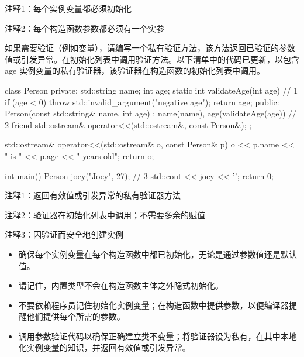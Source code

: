 {\footnotesize
注释1：每个实例变量都必须初始化

注释2：每个构造函数参数都必须有一个实参
}

如果需要验证（例如变量），请编写一个私有验证方法，该方法返回已验证的参数值或引发异常。在初始化列表中调用验证方法。以下清单中的代码已更新，以包含 age 实例变量的私有验证器，该验证器在构造函数的初始化列表中调用。


\begin{cpp}
class Person {
private:
  std::string name;
  int age;
  static int validateAge(int age) { // 1
    if (age < 0)
      throw std::invalid_argument("negative age");
    return age;
  }
public:
  Person(const std::string& name, int age) :
  name(name), age(validateAge(age)) {} // 2
  friend std::ostream& operator<<(std::ostream&, const Person&);
};

std::ostream& operator<<(std::ostream& o, const Person& p) {
  o << p.name << " is " << p.age << " years old";
  return o;
}

int main() {
  Person joey("Joey", 27); // 3
  std::cout << joey << '\n';
  return 0;
}
\end{cpp}

{\footnotesize
注释1：返回有效值或引发异常的私有验证器方法

注释2：验证器在初始化列表中调用；不需要多余的赋值

注释3：因验证而安全地创建实例
}


\begin{itemize}
\item
确保每个实例变量在每个构造函数中都已初始化，无论是通过参数值还是默认值。

\item
请记住，内置类型不会在构造函数主体之外隐式初始化。

\item
不要依赖程序员记住初始化实例变量；在构造函数中提供参数，以便编译器提醒他们提供每个所需的参数。

\item
调用参数验证代码以确保正确建立类不变量；将验证器设为私有，在其中本地化实例变量的知识，并返回有效值或引发异常。
\end{itemize}
